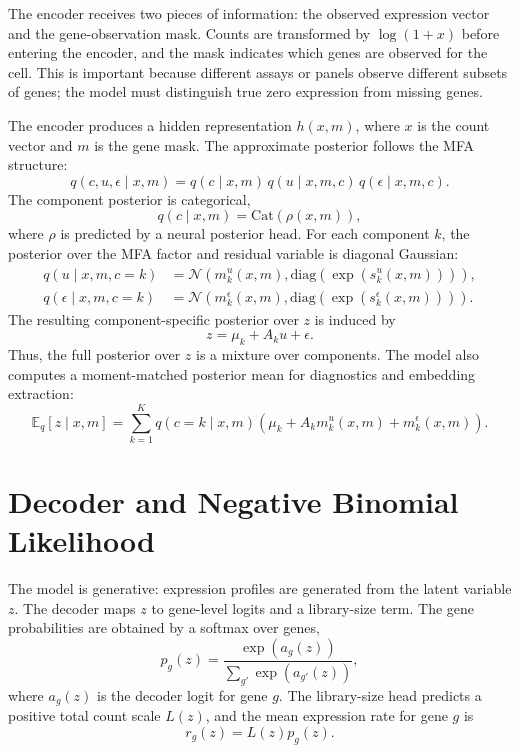 \documentclass[11pt]{article}
\begin{document}
The encoder receives two pieces of information: the observed expression vector and the gene-observation mask. Counts are transformed by $\log(1+x)$ before entering the encoder, and the mask indicates which genes are observed for the cell. This is important because different assays or panels observe different subsets of genes; the model must distinguish true zero expression from missing genes.

The encoder produces a hidden representation $h(x,m)$, where $x$ is the count vector and $m$ is the gene mask. The approximate posterior follows the MFA structure:
\begin{equation}
    q(c,u,\epsilon \mid x,m)
    = q(c \mid x,m)\, q(u \mid x,m,c)\, q(\epsilon \mid x,m,c).
\end{equation}
The component posterior is categorical,
\begin{equation}
    q(c \mid x,m) = \mathrm{Cat}\left(\rho(x,m)\right),
\end{equation}
where $\rho$ is predicted by a neural posterior head. For each component $k$, the posterior over the MFA factor and residual variable is diagonal Gaussian:
\begin{align}
    q(u \mid x,m,c=k) &= \mathcal{N}\left(m^u_k(x,m), \mathrm{diag}\left(\exp(s^u_k(x,m))\right)\right), \\
    q(\epsilon \mid x,m,c=k) &= \mathcal{N}\left(m^\epsilon_k(x,m), \mathrm{diag}\left(\exp(s^\epsilon_k(x,m))\right)\right).
\end{align}
The resulting component-specific posterior over $z$ is induced by
\begin{equation}
    z = \mu_k + A_k u + \epsilon.
\end{equation}
Thus, the full posterior over $z$ is a mixture over components. The model also computes a moment-matched posterior mean for diagnostics and embedding extraction:
\begin{equation}
    \mathbb{E}_q[z \mid x,m]
    = \sum_{k=1}^{K} q(c=k \mid x,m)
    \left(\mu_k + A_k m^u_k(x,m) + m^\epsilon_k(x,m)\right).
\end{equation}

\section{Decoder and Negative Binomial Likelihood}

The model is generative: expression profiles are generated from the latent variable $z$. The decoder maps $z$ to gene-level logits and a library-size term. The gene probabilities are obtained by a softmax over genes,
\begin{equation}
    p_g(z) = \frac{\exp(a_g(z))}{\sum_{g'} \exp(a_{g'}(z))},
\end{equation}
where $a_g(z)$ is the decoder logit for gene $g$. The library-size head predicts a positive total count scale $L(z)$, and the mean expression rate for gene $g$ is
\begin{equation}
    r_g(z) = L(z) p_g(z).
\end{equation}
\end{document}
